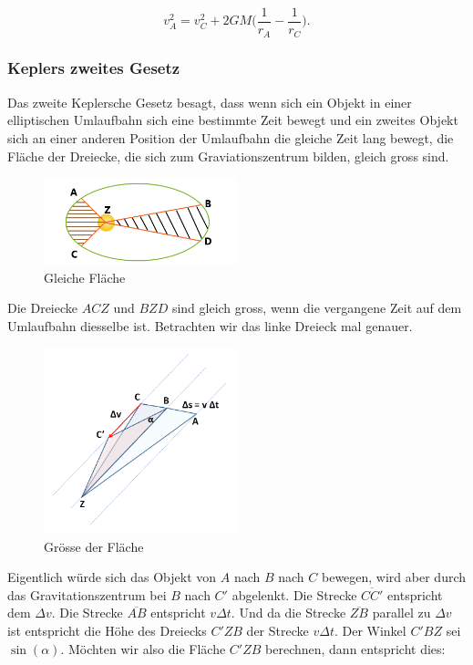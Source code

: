 \begin{refsection}
\begin{equation}
v_A^2 = v_C^2 + 2GM \biggl( \frac{1}{r_A} - \frac{1}{r_C}\biggr).
\label{eq:keplerenergie}
\end{equation}

\subsubsection{Keplers zweites Gesetz}
Das zweite Keplersche Gesetz besagt, dass wenn sich ein Objekt in einer elliptischen Umlaufbahn sich eine bestimmte Zeit bewegt und ein zweites Objekt sich an einer anderen Position der Umlaufbahn die gleiche Zeit lang bewegt, die Fläche der Dreiecke, die sich zum Graviationszentrum bilden, gleich gross sind.
\begin{figure}[h]
\centering
\includegraphics[width=0.5\textwidth]{gps/pictures/keplersec.png}
\caption{Gleiche Fläche}
\end{figure}
Die Dreiecke $ACZ$ und $BZD$ sind gleich gross, wenn die vergangene Zeit auf dem Umlaufbahn diesselbe ist. Betrachten wir das linke Dreieck mal genauer.
\begin{figure}[H]
\centering
\includegraphics[width=0.5\textwidth]{gps/pictures/KeplerArea.png}
\caption{Grösse der Fläche}
\label{pic:flaeche}
\end{figure}
Eigentlich würde sich das Objekt von $A$ nach $B$ nach $C$ bewegen, wird aber durch das Gravitationszentrum bei $B$ nach $C'$ abgelenkt. Die Strecke $\overline{CC'}$ entspricht dem $\Delta v$. Die Strecke $\overline{AB}$ entspricht $v \Delta t$. Und da die Strecke $\overline{ZB}$ parallel zu $\Delta v$ ist entspricht die Höhe des Dreiecks $C'ZB$ der Strecke $v \Delta t$. Der Winkel $C'BZ$ sei $\sin(\alpha)$. Möchten wir also die Fläche $C'ZB$ berechnen, dann entspricht dies:

\end{refsection}
